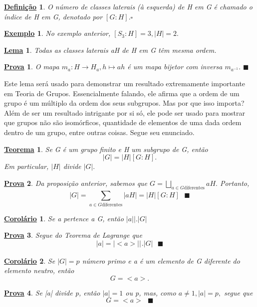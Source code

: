 \documentclass{article}
\newtheorem*{def*}{\underline{Defini\c c\~ao}}
\newtheorem*{theorem*}{\underline{Teorema}}
\newtheorem*{crl*}{\underline{Corol\'ario}}
\newtheorem{example*}{\underline{Exemplo}}
\newtheorem*{proof*}{\underline{Prova}}
\newtheorem*{lemma*}{\underline{Lema}}
\renewcommand\qedsymbol{$\blacksquare$}
\begin{document}
\begin{def*}
  O n\'umero de classes laterais (\`a esquerda) de H em G \'e chamado o \'indice de H em G, denotado por $[G:H].\square$
\end{def*}
\begin{example*}
  No exemplo anterior, $[S_{3} : H]=3, |H| = 2.$
\end{example*}
\begin{lemma*}
  Todas as classes laterais aH de H em G t\^em mesma ordem.
\end{lemma*}
\begin{proof*}
  O mapa $m_{a}:H\rightarrow H_{a}, h\mapsto ah$ \'e um mapa bijetor com inversa $m_{a^{-1}}.$ \qedsymbol
\end{proof*}
  Este lema ser\'a usado para demonstrar um resultado extremamente importante em Teoria de Grupos. Essencialmente falando,
ele afirma que a ordem de um grupo \'e um m\'ultiplo da ordem dos seus subgrupos. Mas por que isso importa? Al\'em de ser um
resultado intrigante por si s\'o, ele pode ser usado para mostrar que grupos n\~ao s\~ao isom\'orficos, quantidade de elementos de 
uma dada ordem dentro de um grupo, entre outras coisas. Segue seu enunciado.
\begin{theorem*}
  Se G \'e um grupo finito e H um subgrupo de G, ent\~ao 
    $$
      |G| = |H|[G:H].
    $$ 
  Em particular, $|H|$ divide $|G|.$
\end{theorem*}
\begin{proof*}
  Da proposi\c c\~ao anterior, sabemos que $G = \bigsqcup_{a\in{G}\text{diferentes}}^{}{aH}.$ Portanto,
    $$
    |G| = \sum\limits_{a\in{G}\text{diferentes}}^{}|aH| = |H|[G:H]\text{ \qedsymbol}
    $$
\end{proof*}
\begin{crl*}
  Se a pertence a G, ent\~ao $|a|\biggl|\biggr.|G|$
\end{crl*}
\begin{proof*}
  Segue do Teorema de Lagrange que  
    $$
    |a|=|<a>|\biggl|_{}^{}\biggr.|G|\text{ \qedsymbol}
    $$
\end{proof*}
\begin{crl*}
  Se $|G|=p$ n\'umero primo e a \'e um elemento de G diferente do elemento neutro, ent\~ao 
    $$
      G = <a>.
    $$
\end{crl*}
\begin{proof*}
  Se |a| divide p, ent\~ao $|a|=1$ ou p, mas, como $a\neq 1, |a| = p,$ segue que
    $$
    G = <a>\text{ \qedsymbol}
    $$
\end{proof*}
\end{document}
